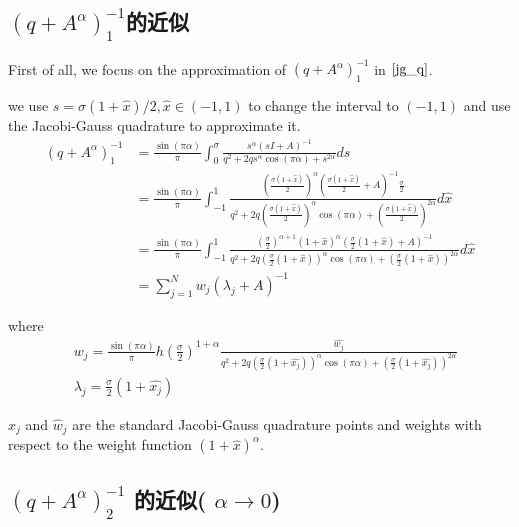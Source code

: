 \subsection{$(q+A^{\alpha})^{-1}_1$的近似}

First of all, we focus on the approximation of $(q+A^{\alpha})^{-1}_1$ in $\eqref{jg_q}$. 

we use $s=\sigma(1+\hat{x})/2,\hat{x}\in (-1,1)$ to change the interval to $(-1, 1)$ and use the Jacobi-Gauss quadrature to approximate it.
\begin{equation}
	\begin{aligned}
		(q+A^{\alpha})^{-1}_1&=\frac{\sin(\pi \alpha)}{\pi}\int_0^{\sigma}\frac{s^{\alpha}(s{I}+{A})^{-1}}{q^2+2qs^{\alpha}\cos(\pi\alpha)+s^{2\alpha}}ds\\
		&=\frac{\sin(\pi \alpha)}{\pi}\int_{-1}^{1}\frac{\left(\frac{\sigma(1+\hat{x})}{2}\right)^{\alpha}\left(\frac{\sigma(1+\hat{x})}{2}+{A}\right)^{-1}\frac{\sigma}{2}}{q^2+2q\left(\frac{\sigma(1+\hat{x})}{2}\right)^{\alpha}\cos(\pi\alpha)+\left(\frac{\sigma(1+\hat{x})}{2}\right)^{2\alpha}}d\hat{x}\\
		&=\frac{\sin(\pi \alpha)}{\pi}\int_{-1}^{1}\frac{\left(\frac{\sigma}{2}\right)^{\alpha+1}(1+\hat{x})^{\alpha}\left(\frac{\sigma}{2}(1+\hat{x})+{A}\right)^{-1}}{q^2+2q\left(\frac{\sigma}{2}(1+\hat{x})\right)^{\alpha}\cos(\pi\alpha)+\left(\frac{\sigma}{2}(1+\hat{x})\right)^{2\alpha}}d\hat{x}\\
		&=\sum_{j=1}^{N}w_j(\lambda_j+A)^{-1}
	\end{aligned}
\label{SE0_q1}
\end{equation}

where
\begin{equation}
	\begin{aligned}
		& w_j=\frac{\sin(\pi\alpha)}{\pi}h(\frac{\sigma}{2})^{1+\alpha}\frac{\hat{w_j}}{q^2+2q\left(\frac{\sigma}{2}(1+\hat{x_j})\right)^{\alpha}\cos(\pi\alpha)+\left(\frac{\sigma}{2}(1+\hat{x_j})\right)^{2\alpha}}\\
		& \lambda_j=\frac{\sigma}{2}(1+\hat{x_j})
	\end{aligned}
\label{lw_SE0_q1}
\end{equation}

$\hat{x}_j$ and $\hat{w}_j$ are the standard Jacobi-Gauss quadrature points and weights with respect to the weight function $(1+\hat{x})^{\alpha}$.

\subsection{$(q+A^{\alpha})^{-1}_2$ 的近似( $\alpha \rightarrow 0$)}

